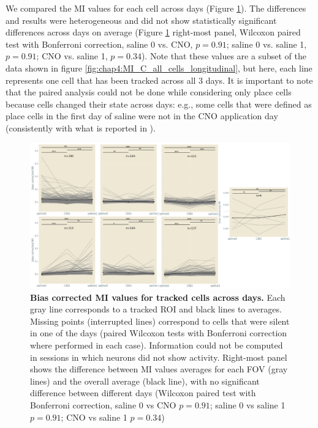 We compared the MI values for each cell across days (Figure \ref{fig:chap4:MI_C_tracked_cells_longitudinal}).
The differences and results were heterogeneous and did not show statistically significant differences across days on average (Figure \ref{fig:chap4:MI_C_tracked_cells_longitudinal} right-most panel, Wilcoxon paired test with Bonferroni correction, saline 0 vs. CNO, $p=0.91$; saline 0 vs. saline 1, $p=0.91$; CNO vs. saline 1, $p=0.34$).
Note that these values are a subset of the data shown in figure \ref{fig:chap4:MI_C_all_cells_longitudinal}, but here, each line represents one cell that has been tracked across all 3 days. 
It is important to note that the paired analysis could not be done while considering only place cells because cells changed their state across days: e.g., some cells that were defined as place cells in the first day of saline were not in the CNO application day (consistently with what is reported in \cite{ziv2013}).

\begin{figure}
    \centering
    \includegraphics[width=\textwidth]{Figures/Chapter4/MI_C_tracked_cells_longitudinal.pdf}
    \caption[Bias corrected MI values for tracked cells across days]{\textbf{Bias corrected MI values for tracked cells across days.} 
    Each gray line corresponds to a tracked ROI and black lines to averages. 
    Missing points (interrupted lines) correspond to cells that were silent in one of the days (paired Wilcoxon tests with Bonferroni correction where performed in each case). 
    Information could not be computed in sessions in which neurons did not show activity. 
    Right-most panel shows the difference between MI values averages for each FOV (gray lines) and the overall average (black line), with no significant difference between different days (Wilcoxon paired test with Bonferroni correction, saline 0 vs CNO $p=0.91$; saline 0 vs saline 1 $p=0.91$; CNO vs saline 1 $p=0.34$) }
    \label{fig:chap4:MI_C_tracked_cells_longitudinal}
\end{figure}


